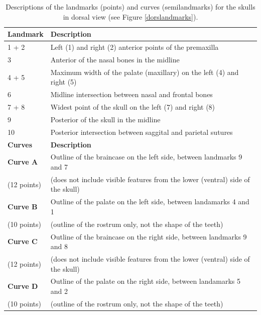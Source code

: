 \documentclass[12pt,a4paper]{article}
\begin{document}
\begin{table}[H]			
\centering
\caption{Descriptions of the landmarks (points) and curves (semilandmarks) for the skulls in dorsal view (see Figure \ref{dorslandmarks}).}
\begin{tabular}[t]{l l}		
\hline
\textbf{Landmark} & \textbf{Description} \\
\hline
1 + 2 & Left (1) and right (2) anterior points of the premaxilla \\
3 & Anterior of the nasal bones in the midline \\
4 + 5 &	Maximum width of the palate (maxillary) on the left (4) and right (5)\\
6 & Midline intersection between nasal and frontal bones \\
7 + 8 & Widest point of the skull on the left (7) and right (8) \\
9 &	Posterior of the skull in the midline \\
10 & Posterior intersection between saggital and parietal sutures \\

\hline
\textbf{Curves} & \textbf{Description}\\
\hline

\textbf{Curve A} & Outline of the braincase on the left side, between landmarks 9 and 7\\ 
(12 points) & (does not include visible features from the lower (ventral) side of the skull) \\

\textbf{Curve B} & Outline of the palate on the left side, between landamarks 4 and 1 \\
(10 points) & (outline of the rostrum only, not the shape of the teeth)\\

\textbf{Curve C} &	Outline of the braincase on the right side, between landmarks 9 and 8 \\
(12 points) & (does not include visible features from the lower (ventral) side of the skull) \\

\textbf{Curve D} & Outline of the palate on the right side, between landamarks 5 and 2 \\
(10 points) & (outline of the rostrum only, not the shape of the teeth)\\

\hline
\end{tabular}
\label{dorslanddesc} %
\end{table}
\end{document}
